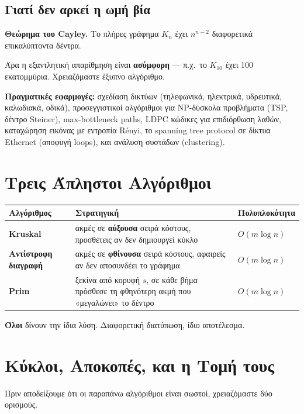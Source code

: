 \documentclass[11pt,a4paper]{article}
\begin{document}
\subsection{Γιατί δεν αρκεί η ωμή βία}

\begin{keypoint}
\textbf{Θεώρημα του Cayley.} Το πλήρες γράφημα $K_n$ έχει \textbf{$n^{n-2}$}
διαφορετικά επικαλύπτοντα δέντρα.
\end{keypoint}

Άρα η εξαντλητική απαρίθμηση είναι \textbf{ασύμφορη} --- π.χ.\ το $K_{10}$ έχει
100 εκατομμύρια. Χρειαζόμαστε έξυπνο αλγόριθμο.

\textbf{Πραγματικές εφαρμογές:} σχεδίαση δικτύων (τηλεφωνικά, ηλεκτρικά,
υδρευτικά, καλωδιακά, οδικά), προσεγγιστικοί αλγόριθμοι για NP-δύσκολα προβλήματα
(TSP, δέντρο Steiner), max-bottleneck paths, LDPC κώδικες για επιδιόρθωση
λαθών, καταχώρηση εικόνας με εντροπία Rényi, το spanning tree protocol σε δίκτυα
Ethernet (αποφυγή loops), και ανάλυση συστάδων (clustering).

\section{Τρεις Άπληστοι Αλγόριθμοι}

\begin{center}
\begin{tabular}{@{}l p{6.6cm} l@{}}
\toprule
Αλγόριθμος & Στρατηγική & Πολυπλοκότητα \\
\midrule
\textbf{Kruskal} & ακμές σε \textbf{αύξουσα} σειρά κόστους, προσθέτεις αν δεν
δημιουργεί κύκλο & $O(m \log n)$ \\
\textbf{Αντίστροφη διαγραφή} & ακμές σε \textbf{φθίνουσα} σειρά κόστους, αφαιρείς
αν δεν αποσυνδέει το γράφημα & $O(m \log n)$ \\
\textbf{Prim} & ξεκίνα από κορυφή $s$, σε κάθε βήμα πρόσθεσε τη φθηνότερη ακμή
που «μεγαλώνει» το δέντρο & $O(m \log n)$ \\
\bottomrule
\end{tabular}
\end{center}

\textbf{Όλοι} δίνουν την ίδια λύση. Διαφορετική διατύπωση, ίδιο αποτέλεσμα.

\section{Κύκλοι, Αποκοπές, και η Τομή τους}

Πριν αποδείξουμε ότι οι παραπάνω αλγόριθμοι είναι σωστοί, χρειαζόμαστε δύο
ορισμούς.
\end{document}
